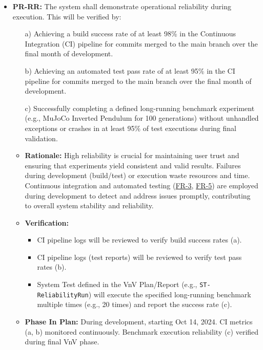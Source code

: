 \documentclass[12pt]{article}
\begin{document}
\begin{itemize}
\item \label{PR-RR} \textbf{PR-RR:} The system shall demonstrate operational reliability during execution. This will be verified by:
    \begin{itemize}
        \item[a)] Achieving a build success rate of at least 98\% in the Continuous Integration (CI) pipeline for commits merged to the main branch over the final month of development.
        \item[b)] Achieving an automated test pass rate of at least 95\% in the CI pipeline for commits merged to the main branch over the final month of development.
        \item[c)] Successfully completing a defined long-running benchmark experiment (e.g., MuJoCo Inverted Pendulum for 100 generations) without unhandled exceptions or crashes in at least 95\% of test executions during final validation.
    \end{itemize}
    \begin{itemize}
        \item \textbf{Rationale:} High reliability is crucial for maintaining user trust and ensuring that experiments yield consistent and valid results. Failures during development (build/test) or execution waste resources and time. Continuous integration and automated testing (\hyperref[FR-3]{FR-3}, \hyperref[FR-5]{FR-5}) are employed during development to detect and address issues promptly, contributing to overall system stability and reliability.
        \item \textbf{Verification:}
            \begin{itemize}
                \item CI pipeline logs will be reviewed to verify build success rates (a).
                \item CI pipeline logs (test reports) will be reviewed to verify test pass rates (b).
                \item System Test defined in the VnV Plan/Report (e.g., \texttt{ST-ReliabilityRun}) will execute the specified long-running benchmark multiple times (e.g., 20 times) and report the success rate (c).
            \end{itemize}
        \item \textbf{Phase In Plan:} During development, starting Oct 14, 2024. CI metrics (a, b) monitored continuously. Benchmark execution reliability (c) verified during final VnV phase.
    \end{itemize}
\end{itemize}
\end{document}

